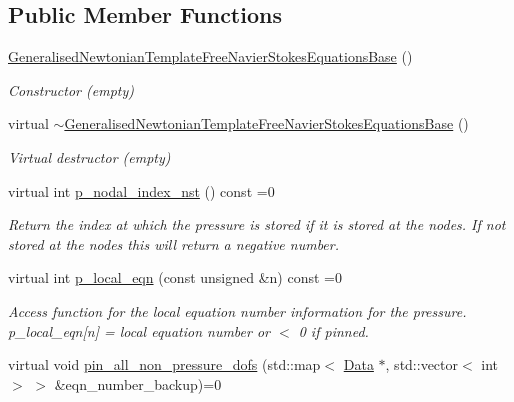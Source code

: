 \subsection*{Public Member Functions}
\begin{DoxyCompactItemize}
\item 
\hyperlink{classoomph_1_1GeneralisedNewtonianTemplateFreeNavierStokesEquationsBase_aa84e6885d642fe71f5b31391001612a0}{Generalised\+Newtonian\+Template\+Free\+Navier\+Stokes\+Equations\+Base} ()
\begin{DoxyCompactList}\small\item\em Constructor (empty) \end{DoxyCompactList}\item 
virtual \hyperlink{classoomph_1_1GeneralisedNewtonianTemplateFreeNavierStokesEquationsBase_af6bb8d2f9a6e2b1d70ec38b5779fd6f6}{$\sim$\+Generalised\+Newtonian\+Template\+Free\+Navier\+Stokes\+Equations\+Base} ()
\begin{DoxyCompactList}\small\item\em Virtual destructor (empty) \end{DoxyCompactList}\item 
virtual int \hyperlink{classoomph_1_1GeneralisedNewtonianTemplateFreeNavierStokesEquationsBase_a649186f26fbe7e3725a50c777a68008b}{p\+\_\+nodal\+\_\+index\+\_\+nst} () const =0
\begin{DoxyCompactList}\small\item\em Return the index at which the pressure is stored if it is stored at the nodes. If not stored at the nodes this will return a negative number. \end{DoxyCompactList}\item 
virtual int \hyperlink{classoomph_1_1GeneralisedNewtonianTemplateFreeNavierStokesEquationsBase_abacdc7add36a8da0b68b9f991e7973d9}{p\+\_\+local\+\_\+eqn} (const unsigned \&n) const =0
\begin{DoxyCompactList}\small\item\em Access function for the local equation number information for the pressure. p\+\_\+local\+\_\+eqn\mbox{[}n\mbox{]} = local equation number or $<$ 0 if pinned. \end{DoxyCompactList}\item 
virtual void \hyperlink{classoomph_1_1GeneralisedNewtonianTemplateFreeNavierStokesEquationsBase_ae5b2fd78047630a2be4d66c541184a46}{pin\+\_\+all\+\_\+non\+\_\+pressure\+\_\+dofs} (std\+::map$<$ \hyperlink{classoomph_1_1Data}{Data} $\ast$, std\+::vector$<$ int $>$ $>$ \&eqn\+\_\+number\+\_\+backup)=0

\end{DoxyCompactItemize}

